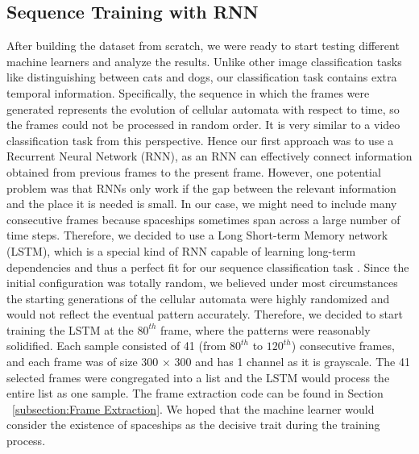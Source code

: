 \documentclass[12pt]{article}
\numberwithin{figure}{section} %
\begin{document}
\subsection{Sequence Training with RNN}
After building the dataset from scratch, we were ready to start testing different machine learners and analyze the results. Unlike other image classification tasks like distinguishing between cats and dogs, our classification task contains extra temporal information. Specifically, the sequence in which the frames were generated represents the evolution of cellular automata with respect to time, so the frames could not be processed in random order. It is very similar to a video classification task from this perspective. Hence our first approach was to use a Recurrent Neural Network (RNN), as an RNN can effectively connect information obtained from previous frames to the present frame. However, one potential problem was that RNNs only work if the gap between the relevant information and the place it is needed is small. In our case, we might need to include many consecutive frames because spaceships sometimes span across a large number of time steps. Therefore, we decided to use a Long Short-term Memory network (LSTM), which is a special kind of RNN capable of learning long-term dependencies and thus a perfect fit for our sequence classification task \cite{LSTM}. Since the initial configuration was totally random, we believed under most circumstances the starting generations of the cellular automata were highly randomized and would not reflect the eventual pattern accurately. Therefore, we decided to start training the LSTM at the $80^{th}$ frame, where the patterns were reasonably solidified. Each sample consisted of 41 (from $80^{th}$ to $120^{th}$) consecutive frames, and each frame was of size 300 × 300 and has 1 channel as it is grayscale. The 41 selected frames were congregated into a list and the LSTM would process the entire list as one sample. The frame extraction code can be found in Section ~\ref{subsection:Frame Extraction}. We hoped that the machine learner would consider the existence of spaceships as the decisive trait during the training process. 
\end{document}
